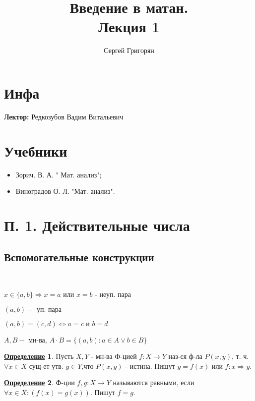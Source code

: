 \documentclass[12pt]{article}
\title{Введение в матан. \\ Лекция 1}
\author{Сергей Григорян}
\theoremstyle{definition}
\newtheorem{definition}{\underline{Определение}}[section]
\theoremstyle{definition}
\begin{document}
\maketitle
\newpage
\section{Инфа}
\textbf{Лектор:} Редкозубов Вадим Витальевич

\section{Учебники}
 \begin{itemize}
    \item Зорич. В. А. " Мат. анализ";
    \item Виноградов О. Л. "Мат. анализ".
 \end{itemize}

\section{П. 1. Действительные числа}
\subsection{Вспомогательные конструкции}
~\newline

$x \in \{a, b\} \Rightarrow x = a \text{ или } x = b$ - неуп. пара 

$(a, b) - \text{ уп. пара}$

 $(a, b) = (c, d) \iff a = c \text{ и } b = d$

$A, B - \text{ мн-ва}$, $A \cdot B = \{(a, b) \colon a \in A \lor b \in B\}$

\begin{definition}
Пусть $X, Y$ - мн-ва
Ф-цией $f\colon X \rightarrow Y$ наз-ся ф-ла $P(x, y)$, т. ч. $\forall x \in X$ сущ-ет утв. $y \in Y$,что $P(x, y)$ - истина. Пишут $y = f(x)$ или $f\colon x \Rightarrow y$.
\end{definition}
\begin{definition}
Ф-ции $f, g\colon X \rightarrow Y$ называются равными, если $\forall x \in X \colon (f(x) = g(x))$. Пишут $f = g$.
\end{definition}
\end{document}
